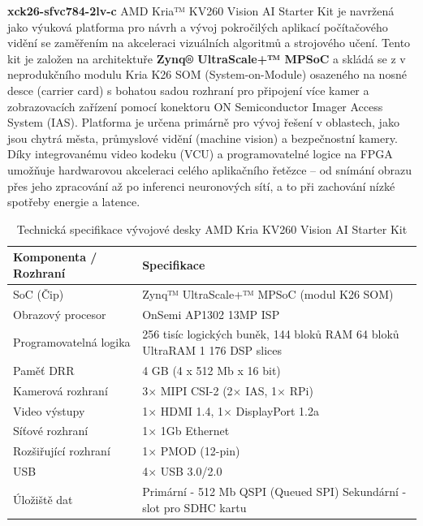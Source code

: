 \documentclass[FM,DP]{tulthesis}
\begin{document}
\textbf{xck26-sfvc784-2lv-c
}
AMD Kria™ KV260 Vision AI Starter Kit je navržená jako výuková platforma pro návrh a vývoj pokročilých aplikací počítačového vidění se zaměřením na akceleraci vizuálních algoritmů a strojového učení. Tento kit je založen na architektuře \textbf{Zynq® UltraScale+™ MPSoC} a skládá se z v neprodukčního modulu Kria K26 SOM (System-on-Module) osazeného na nosné desce (carrier card) s bohatou sadou rozhraní pro připojení více kamer a zobrazovacích zařízení pomocí konektoru ON Semiconductor Imager Access System (IAS).
Platforma je určena primárně pro vývoj řešení v oblastech, jako jsou chytrá města, průmyslové vidění (machine vision) a bezpečnostní kamery. Díky integrovanému video kodeku (VCU) a programovatelné logice na FPGA umožňuje hardwarovou akceleraci celého aplikačního řetězce – od snímání obrazu přes jeho zpracování až po inferenci neuronových sítí, a to při zachování nízké spotřeby energie a latence. \cite{amd_kv260}

\begin{table}[htbp]
    \centering
    \caption{Technická specifikace vývojové desky AMD Kria KV260 Vision AI Starter Kit \cite{amd_kv260}}
    \label{tab:kv260-specs}
    \begin{tabular}{@{}ll@{}}
        \toprule
        \textbf{Komponenta / Rozhraní} & \textbf{Specifikace}                                \\ \midrule
        SoC (Čip)                      & Zynq™ UltraScale+™ MPSoC (modul K26 SOM)            \\
        Obrazový procesor              & OnSemi AP1302 13MP ISP                              \\
        Programovatelná logika         & 256 tisíc logických buněk,
        144 bloků RAM
        64 bloků UltraRAM
        1 176 DSP slices                                                                     \\
        Paměť DRR                      & 4 GB (4 x 512 Mb x 16 bit)                          \\
        Kamerová rozhraní              & 3$\times$ MIPI CSI-2 (2$\times$ IAS, 1$\times$ RPi) \\
        Video výstupy                  & 1$\times$ HDMI 1.4, 1$\times$ DisplayPort 1.2a      \\
        Síťové rozhraní                & 1$\times$ 1Gb Ethernet                              \\
        Rozšiřující rozhraní           & 1$\times$ PMOD (12-pin)                             \\
        USB                            & 4$\times$ USB 3.0/2.0                               \\
        Úložiště dat                   & Primární  - 512 Mb QSPI (Queued SPI)
        Sekundární - slot pro SDHC kartu                                                     \\
    \end{tabular}
\end{table}
\end{document}
